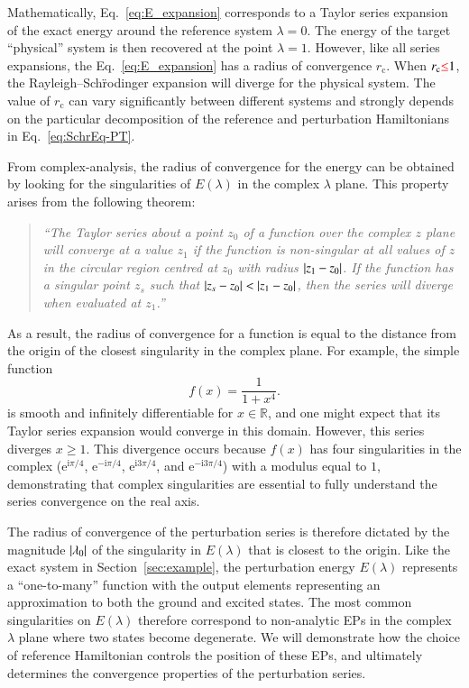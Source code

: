 \documentclass[aps,prb,reprint,noshowkeys,superscriptaddress]{revtex4-1}
\newcommand{\titou}[1]{\textcolor{red}{#1}}
\renewcommand{\i}{\mathrm{i}} %
\newcommand{\e}{\mathrm{e}} %
\newcommand{\rc}{r_{\text{c}}}
\begin{document}
Mathematically, Eq.~\eqref{eq:E_expansion} corresponds to a Taylor series expansion of the exact energy
around the reference system $\lambda = 0$.
The energy of the target ``physical'' system is then recovered at the point $\lambda = 1$.
However, like all series expansions, the Eq.~\eqref{eq:E_expansion} has a radius of convergence $\rc$. 
When $\rc \titou{\le} 1$, the Rayleigh--Sch\"{r}odinger expansion will diverge
for the physical system.
The value of $\rc$ can vary significantly between different systems and strongly depends on the particular decomposition
of the reference and perturbation Hamiltonians in Eq.~\eqref{eq:SchrEq-PT}.\cite{Mihalka_2017b}

From complex-analysis, the radius of convergence for the energy can be obtained by looking for the 
singularities of $E(\lambda)$ in the complex $\lambda$ plane.
This property arises from the following theorem: \cite{Goodson_2012}
\begin{quote}
\it
``The Taylor series about a point $z_0$ of a function over the complex $z$ plane will converge at a value $z_1$ 
if the function is non-singular at all values of $z$ in the circular region centred at $z_0$ with radius $\abs{z_1-z_0}$. 
If the function has a singular point $z_s$ such that $\abs{z_s-z_0} < \abs{z_1-z_0}$, 
then the series will diverge when evaluated at $z_1$.''
\end{quote}
As a result, the radius of convergence for a function is equal to the distance from the origin of the closest singularity
in the complex plane.
For example, the simple function \cite{BenderBook}
\begin{equation} \label{eq:DivExample}
	f(x)=\frac{1}{1+x^4}.
\end{equation}
is smooth and infinitely differentiable for $x \in \mathbb{R}$, and one might expect that its Taylor series expansion would 
converge in this domain.
However, this series diverges $x \ge 1$.
This divergence occurs because $f(x)$ has four singularities in the complex 
($\e^{\i\pi/4}$, $\e^{-\i\pi/4}$, $\e^{\i3\pi/4}$, and $\e^{-\i3\pi/4}$) with a modulus equal to $1$, demonstrating
that complex singularities are essential to fully understand the series convergence on the real axis.

The radius of convergence of the perturbation series is therefore dictated by the magnitude $\abs{\lambda_0}$ of the
singularity in $E(\lambda)$ that is closest to the origin.
Like the exact system in Section~\ref{sec:example}, the perturbation energy $E(\lambda)$ represents
a ``one-to-many'' function with the output elements representing an approximation to both the ground and excited states.
The most common singularities on $E(\lambda)$ therefore correspond to non-analytic EPs in the complex 
$\lambda$ plane where two states become degenerate.
We will demonstrate how the choice of reference Hamiltonian controls the position of these EPs, and 
ultimately determines the convergence properties of the perturbation series.
\end{document}
